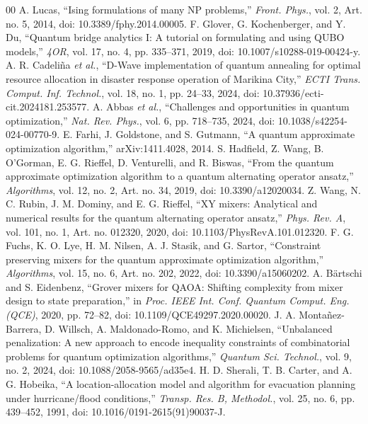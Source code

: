\documentclass[conference]{IEEEtran}
\begin{document}
\balance
\begin{thebibliography}{00}
 A. Lucas, ``Ising formulations of many NP problems,'' \textit{Front. Phys.}, vol. 2, Art. no. 5, 2014, doi: 10.3389/fphy.2014.00005.
 F. Glover, G. Kochenberger, and Y. Du, ``Quantum bridge analytics I: A tutorial on formulating and using QUBO models,'' \textit{4OR}, vol. 17, no. 4, pp. 335--371, 2019, doi: 10.1007/s10288-019-00424-y.
 A. R. Cadeli\~{n}a \textit{et al.}, ``D-Wave implementation of quantum annealing for optimal resource allocation in disaster response operation of Marikina City,'' \textit{ECTI Trans. Comput. Inf. Technol.}, vol. 18, no. 1, pp. 24--33, 2024, doi: 10.37936/ecti-cit.2024181.253577.
 A. Abbas \textit{et al.}, ``Challenges and opportunities in quantum optimization,'' \textit{Nat. Rev. Phys.}, vol. 6, pp. 718--735, 2024, doi: 10.1038/s42254-024-00770-9.
 E. Farhi, J. Goldstone, and S. Gutmann, ``A quantum approximate optimization algorithm,'' arXiv:1411.4028, 2014.
 S. Hadfield, Z. Wang, B. O'Gorman, E. G. Rieffel, D. Venturelli, and R. Biswas, ``From the quantum approximate optimization algorithm to a quantum alternating operator ansatz,'' \textit{Algorithms}, vol. 12, no. 2, Art. no. 34, 2019, doi: 10.3390/a12020034.
 Z. Wang, N. C. Rubin, J. M. Dominy, and E. G. Rieffel, ``XY mixers: Analytical and numerical results for the quantum alternating operator ansatz,'' \textit{Phys. Rev. A}, vol. 101, no. 1, Art. no. 012320, 2020, doi: 10.1103/PhysRevA.101.012320.
 F. G. Fuchs, K. O. Lye, H. M. Nilsen, A. J. Stasik, and G. Sartor, ``Constraint preserving mixers for the quantum approximate optimization algorithm,'' \textit{Algorithms}, vol. 15, no. 6, Art. no. 202, 2022, doi: 10.3390/a15060202.
 A. B\"{a}rtschi and S. Eidenbenz, ``Grover mixers for QAOA: Shifting complexity from mixer design to state preparation,'' in \textit{Proc. IEEE Int. Conf. Quantum Comput. Eng. (QCE)}, 2020, pp. 72--82, doi: 10.1109/QCE49297.2020.00020.
 J. A. Monta\~{n}ez-Barrera, D. Willsch, A. Maldonado-Romo, and K. Michielsen, ``Unbalanced penalization: A new approach to encode inequality constraints of combinatorial problems for quantum optimization algorithms,'' \textit{Quantum Sci. Technol.}, vol. 9, no. 2, 2024, doi: 10.1088/2058-9565/ad35e4.
 H. D. Sherali, T. B. Carter, and A. G. Hobeika, ``A location-allocation model and algorithm for evacuation planning under hurricane/flood conditions,'' \textit{Transp. Res. B, Methodol.}, vol. 25, no. 6, pp. 439--452, 1991, doi: 10.1016/0191-2615(91)90037-J.

\end{thebibliography}
\end{document}
